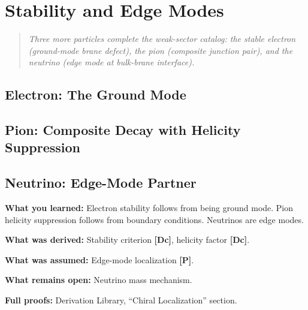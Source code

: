 \documentclass[11pt,a4paper]{book}
\theoremstyle{definition}
\theoremstyle{remark}
\newcommand{\tagDc}{\textcolor{calibratedColor}{\textbf{[Dc]}}}
\newcommand{\tagP}{\textcolor{postulatedColor}{\textbf{[P]}}}
\begin{document}
\chapter{Stability and Edge Modes}
\label{ch:stability_edge}

\begin{quote}
\textit{Three more particles complete the weak-sector catalog: the stable electron
(ground-mode brane defect), the pion (composite junction pair), and the neutrino
(edge mode at bulk-brane interface).}
\end{quote}

\section{Electron: The Ground Mode}



\section{Pion: Composite Decay with Helicity Suppression}



\section{Neutrino: Edge-Mode Partner}



\begin{chapterRecap}
\textbf{What you learned:} Electron stability follows from being ground mode.
Pion helicity suppression follows from boundary conditions. Neutrinos are edge modes.

\textbf{What was derived:} Stability criterion \tagDc{}, helicity factor \tagDc{}.

\textbf{What was assumed:} Edge-mode localization \tagP{}.

\textbf{What remains open:} Neutrino mass mechanism.

\textbf{Full proofs:} Derivation Library, ``Chiral Localization'' section.
\end{chapterRecap}
\end{document}
